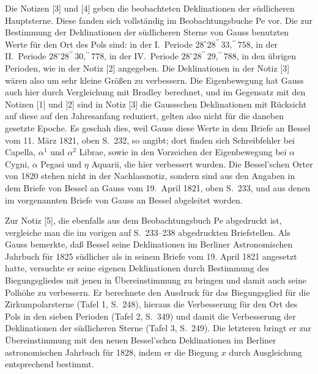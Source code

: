 \documentclass[12pt,a4paper]{article}
\theoremstyle{plain}
\theoremstyle{definition}
\theoremstyle{remark}
\begin{document}
\newpage

Die Notizen [3] und [4] geben die beobachteten Deklinationen der s\"udlicheren Hauptsterne. Diese fanden sich vollst\"andig im Beobachtungsbuche Pe vor. Die zur Bestimmung der Deklinationen der s\"udlicheren Sterne von Gauss benutzten Werte f\"ur den Ort des Pols sind: in der I.~Periode $28^{\circ}28^{\prime\prime}\,33{,}^{\!\prime\prime}758$, in der II.~Periode $28^{\circ}28^{\prime\prime}\,30{,}^{\!\prime\prime}778$, in der IV.~Periode $28^{\circ}28^{\prime\prime}\,29{,}^{\!\prime\prime}788$, in den \"ubrigen Perioden, wie in der Notiz [2] angegeben. Die Deklinationen in der Notiz [3] w\"aren also um sehr kleine Gr\"o\ss en zu verbessern. Die Eigenbewegung hat Gauss auch hier durch Vergleichung mit Bradley berechnet, und im Gegensatz mit den Notizen [1] und [2] sind in Notiz [3] die Gaussschen Deklinationen mit R\"ucksicht auf diese auf den Jahresanfang reduziert, gelten also nicht f\"ur die daneben gesetzte Epoche. Es geschah dies, weil Gauss diese Werte in dem Briefe an Bessel vom 11. M\"arz 1821, oben S.~232, so angibt; dort finden sich Schreibfehler bei Capella, $\alpha^1$ und $\alpha^2$ Librae, sowie in den Vorzeichen der Eigenbewegung bei $\alpha$ Cygni, $\alpha$ Pegasi und $\eta$ Aquarii, die hier verbessert wurden. Die Bessel'schen Orter von 1820 stehen nicht in der Nachlassnotiz, sondern sind aus den Angaben in dem Briefe von Bessel an Gauss vom 19.~April 1821, oben S.~233, und aus denen im vorgenannten Briefe von Gauss an Bessel abgeleitet worden.

Zur Notiz [5], die ebenfalls aus dem Beobachtungsbuch Pe abgedruckt ist, vergleiche man die im vorigen auf S.~233--238 abgedruckten Briefstellen. Als Gauss bemerkte, da\ss{} Bessel seine Deklinationen im Berliner Astronomischen Jahrbuch f\"ur 1825 s\"udlicher als in seinem Briefe vom 19. April 1821 angesetzt hatte, versuchte er seine eigenen Deklinationen durch Bestimmung des Biegungsgliedes mit jenen in \"Ubereinstimmung zu bringen und damit auch seine Polh\"ohe zu verbessern. Er berechnete den Ausdruck f\"ur das Biegungsglied f\"ur die Zirkumpolarsterne (Tafel 1, S.~248), hieraus die Verbesserung f\"ur den Ort des Pols in den sieben Perioden (Tafel 2, S.~349) und damit die Verbesserung der Deklinationen der s\"udlicheren Sterne (Tafel 3, S.~249). Die letzteren bringt er zur \"Ubereinstimmung mit den neuen Bessel'schen Deklinationen im Berliner astronomischen Jahrbuch f\"ur 1828, indem er die Biegung $x$ durch Ausgleichung entsprechend bestimmt.
\end{document}
